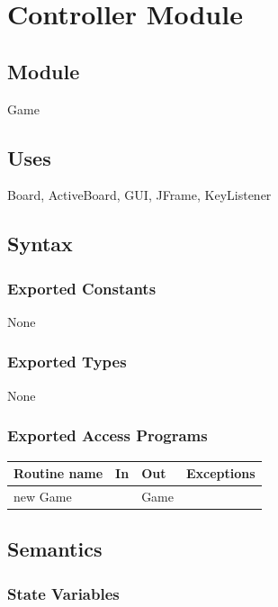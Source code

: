\documentclass[12pt]{article}
\begin{document}
\newpage

\section* {Controller Module}

\subsection*{Module}

Game

\subsection* {Uses}

Board, ActiveBoard, GUI, JFrame, KeyListener

\subsection* {Syntax}

\subsubsection* {Exported Constants}

None

\subsubsection* {Exported Types}

None

\subsubsection* {Exported Access Programs}

\begin{tabular}{| l | l | l | p{5cm} |}
\hline
\textbf{Routine name} & \textbf{In} & \textbf{Out} & \textbf{Exceptions}\\
\hline
new Game & & Game & ~\\
\hline
\end{tabular}

\subsection* {Semantics}

\subsubsection* {State Variables}
\end{document}

